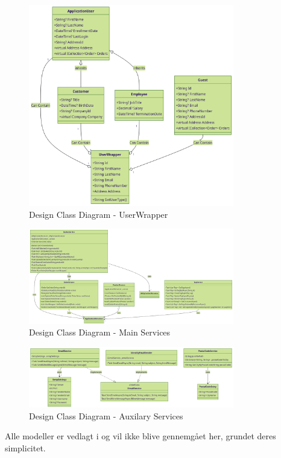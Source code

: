 \begin{figure}
    \centering
    \includegraphics[width=0.8\textwidth]{figures/diagrams/dcd-user-userwrapper.png}
    \caption{Design Class Diagram - UserWrapper}
    \label{fig:class-diagram-userwrapper}
\end{figure}

\begin{figure}
    \centering
    \includegraphics[width=0.8\textwidth]{figures/diagrams/dcd-main-services.png}
    \caption{Design Class Diagram - Main Services}
    \label{fig:class-diagram-main-services}
\end{figure}

\begin{figure}
    \centering
    \includegraphics[width=0.8\textwidth]{figures/diagrams/dcd-aux-services.png}
    \caption{Design Class Diagram - Auxilary Services}
    \label{fig:class-diagram-aux-services}
\end{figure}
Alle modeller er vedlagt i  og vil ikke blive gennemgået her, grundet deres simplicitet.

